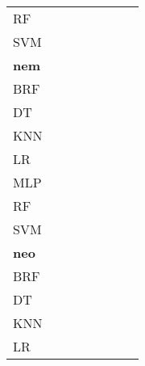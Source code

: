 \documentclass{article}
\begin{document}
{\begin{tabular}{|l|c|c|c|c|c|c|c|}
RF & \cellcolor{white}  & \cellcolor{white}  & \cellcolor{white}  & \cellcolor{black}  & \cellcolor{black}  & \cellcolor{gray}  & \cellcolor{black}  \\ 
SVM & \cellcolor{white}  & \cellcolor{white}  & \cellcolor{white}  & \cellcolor{black}  & \cellcolor{white}  & \cellcolor{white}  & \cellcolor{gray}  \\ 
\hline
\textbf{nem} \\ \hline
BRF & \cellcolor{gray}  & \cellcolor{white}  & \cellcolor{white}  & \cellcolor{black}  & \cellcolor{black}  & \cellcolor{white}  & \cellcolor{black}  \\ 
DT & \cellcolor{white}  & \cellcolor{gray}  & \cellcolor{white}  & \cellcolor{white}  & \cellcolor{white}  & \cellcolor{white}  & \cellcolor{black}  \\ 
KNN & \cellcolor{white}  & \cellcolor{white}  & \cellcolor{gray}  & \cellcolor{white}  & \cellcolor{white}  & \cellcolor{white}  & \cellcolor{white}  \\ 
LR & \cellcolor{white}  & \cellcolor{white}  & \cellcolor{white}  & \cellcolor{gray}  & \cellcolor{white}  & \cellcolor{white}  & \cellcolor{white}  \\ 
MLP & \cellcolor{white}  & \cellcolor{white}  & \cellcolor{white}  & \cellcolor{white}  & \cellcolor{gray}  & \cellcolor{white}  & \cellcolor{white}  \\ 
RF & \cellcolor{white}  & \cellcolor{white}  & \cellcolor{white}  & \cellcolor{black}  & \cellcolor{black}  & \cellcolor{gray}  & \cellcolor{black}  \\ 
SVM & \cellcolor{white}  & \cellcolor{white}  & \cellcolor{white}  & \cellcolor{white}  & \cellcolor{white}  & \cellcolor{white}  & \cellcolor{gray}  \\ 
\hline
\textbf{neo} \\ \hline
BRF & \cellcolor{gray}  & \cellcolor{black}  & \cellcolor{white}  & \cellcolor{black}  & \cellcolor{black}  & \cellcolor{white}  & \cellcolor{black}  \\ 
DT & \cellcolor{white}  & \cellcolor{gray}  & \cellcolor{white}  & \cellcolor{white}  & \cellcolor{white}  & \cellcolor{white}  & \cellcolor{black}  \\ 
KNN & \cellcolor{white}  & \cellcolor{black}  & \cellcolor{gray}  & \cellcolor{black}  & \cellcolor{black}  & \cellcolor{white}  & \cellcolor{black}  \\ 
LR & \cellcolor{white}  & \cellcolor{white}  & \cellcolor{white}  & \cellcolor{gray}  & \cellcolor{white}  & \cellcolor{white}  & \cellcolor{black}  \\ 

\end{tabular}}
\end{document}
